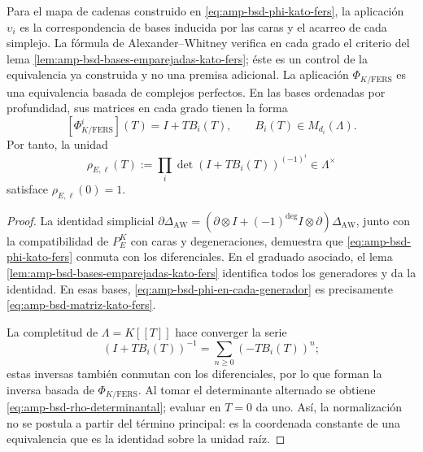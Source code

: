 \begin{lemma}
\label{lem:amp-bsd-equivalencia-kato-fers}
Para el mapa de cadenas construido en
\eqref{eq:amp-bsd-phi-kato-fers}, la aplicación \(\upsilon_i\) es la
correspondencia de bases inducida por las caras y el acarreo de cada
simplejo. La fórmula de Alexander--Whitney verifica en cada grado el
criterio del lema \ref{lem:amp-bsd-bases-emparejadas-kato-fers}; éste es un
control de la equivalencia ya construida y no una premisa adicional.
La aplicación \(\Phi_{K/\mathrm{FERS}}\) es una equivalencia basada de
complejos perfectos. En las bases ordenadas por profundidad, sus matrices en
cada grado tienen la forma
\begin{equation}\label{eq:amp-bsd-matriz-kato-fers}
 [\Phi_{K/\mathrm{FERS}}^i](T)=I+TB_i(T),
 \qquad B_i(T)\in M_{d_i}(\Lambda).
\end{equation}
Por tanto, la unidad
\begin{equation}\label{eq:amp-bsd-rho-determinantal}
 \rho_{E,\ell}(T)
 :=\prod_i\det\!\left(I+TB_i(T)\right)^{(-1)^i}
 \in\Lambda^\times
\end{equation}
satisface \(\rho_{E,\ell}(0)=1\).
\end{lemma}

\begin{proof}
La identidad simplicial
\(\partial\Delta_{\mathrm{AW}}
=(\partial\otimes I+(-1)^{\deg}I\otimes\partial)
\Delta_{\mathrm{AW}}\), junto con la compatibilidad de
\(P_E^K\) con caras y degeneraciones, demuestra que
\eqref{eq:amp-bsd-phi-kato-fers} conmuta con los diferenciales. En el graduado
asociado, el lema
\ref{lem:amp-bsd-bases-emparejadas-kato-fers} identifica todos los
generadores y da la identidad. En esas bases,
\eqref{eq:amp-bsd-phi-en-cada-generador} es precisamente
\eqref{eq:amp-bsd-matriz-kato-fers}.

La completitud de \(\Lambda=K[[T]]\) hace converger la serie
\begin{equation}\label{eq:amp-bsd-inversa-kato-fers}
 (I+TB_i(T))^{-1}
 =\sum_{n\geq0}(-TB_i(T))^n;
\end{equation}
estas inversas también conmutan con los diferenciales, por lo que forman la
inversa basada de \(\Phi_{K/\mathrm{FERS}}\). Al tomar el determinante
alternado se obtiene \eqref{eq:amp-bsd-rho-determinantal}; evaluar en
\(T=0\) da uno. Así, la normalización no se postula a partir del término
principal: es la coordenada constante de una equivalencia que es la identidad
sobre la unidad raíz.
\end{proof}

